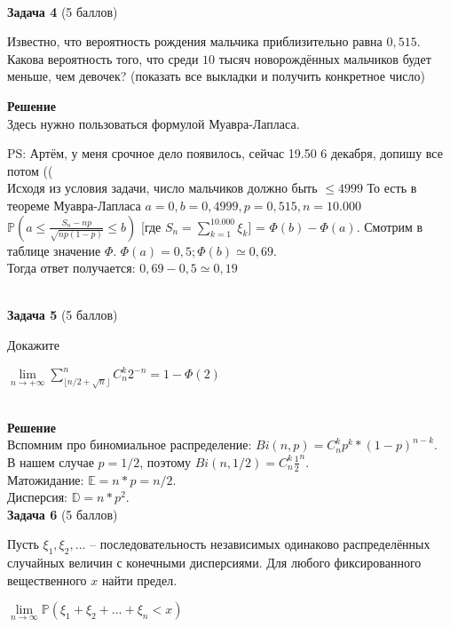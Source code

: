 \documentclass{article}
\newcommand\myp{\mathbb P}
\begin{document}
\\

\textbf{Задача 4} (5 баллов)

Известно, что вероятность рождения мальчика приблизительно равна $0,515$. Какова вероятность того, что среди $10$ тысяч новорождённых мальчиков будет меньше, чем девочек? (показать все выкладки и получить конкретное число)

\textbf{Решение} \\

Здесь нужно пользоваться формулой Муавра-Лапласа.

PS: Артём, у меня срочное дело появилось, сейчас 19.50 6 декабря, допишу все потом (( \\

Исходя из условия задачи, число мальчиков должно быть $\leq 4999$
То есть в теореме Муавра-Лапласа $a = 0, b = 0,4999, p = 0,515, n = 10.000$
$\mathbb P (a \leq \frac{S_n - np}{\sqrt{np(1-p)}} \leq b)$ [где $S_n = \sum_{k=1}^{10.000} \xi_k$] = $\Phi (b) - \Phi (a)$.
Смотрим в таблице значение $\Phi$. $\Phi(a) = 0,5; \Phi(b) \simeq 0,69$.\\
Тогда ответ получается: $0,69 - 0,5 \simeq 0,19$

\\

\textbf{Задача 5} (5 баллов)

Докажите

\begin{center}
    $\lim\limits_{n \to +\infty} \sum\limits_{\lfloor n/2 + \sqrt{n} \rfloor}^{n} C_n^k 2^{-n} = 1 - \Phi(2)$
\end{center}
\\

\textbf{Решение} \\
Вспомним про биномиальное распределение: $Bi(n, p) = C_n^k p^k*(1-p)^{n-k}$.\\
В нашем случае $p = 1/2$, поэтому $Bi(n, 1/2) = C_n^k \frac{1}{2}^n$.\\
Матожидание: $\mathbb E = n*p = n/2$.\\
Дисперсия: $\mathbb D = n*p^2$.\\


\textbf{Задача 6} (5 баллов)


Пусть $\xi_1, \xi_2, \dots$ -- последовательность независимых одинаково распределённых случайных величин с конечными дисперсиями. Для любого фиксированного вещественного $x$ найти предел.
\begin{center}
$\underset{n \to \infty}{\lim}\myp{(\xi_1 + \xi_2 + \dots + \xi_n < x)}$
\end{center}
\end{document}

